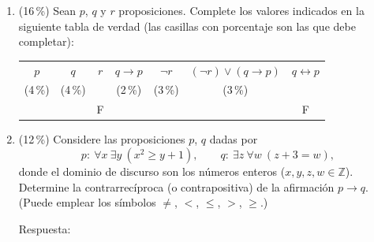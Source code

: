 \documentclass[11pt]{article}
\newcommand{\resplong}{\underline{\hspace{9cm}}}
\begin{document}
\begin{enumerate}
\item (16\,\%) Sean $p$, $q$ y $r$ proposiciones. Complete los valores indicados en la siguiente tabla de verdad (las casillas con porcentaje son las que debe completar):
\begin{center}
\begin{tabular}{|c|c|c|c|c|c|c|}
\hline
$p$ & $q$ & $r$ & $q \to p$ & $\neg r$ & $(\neg r) \vee (q \to p)$ & $q \leftrightarrow p$ \\
\small(4\,\%) & \small(4\,\%) & & \small(2\,\%) & \small(3\,\%) & \small(3\,\%) & \\
\hline
 & & F & & & & F \\
\hline
\end{tabular}
\end{center}

\item (12\,\%) Considere las proposiciones $p$, $q$ dadas por
\[
p : \ \forall x\ \exists y\ (x^2 \geq y + 1), \qquad
q : \ \exists z\ \forall w\ (z + 3 = w),
\]
donde el dominio de discurso son los números enteros ($x,y,z,w \in \mathbb{Z}$). Determine la contrarrecíproca (o contrapositiva) de la afirmación $p \to q$. (Puede emplear los símbolos $\neq$, $<$, $\leq$, $>$, $\geq$.)

\vspace{4pt}
Respuesta: \resplong


\end{enumerate}
\end{document}
